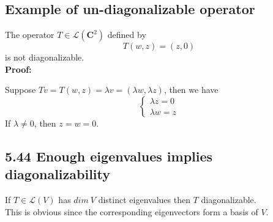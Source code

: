 \documentclass{article}
\begin{document}
\subsection*{Example of un-diagonalizable operator}
The operator $T \in \mathcal{L}(\mathbf{C}^2)$ defined by
\begin{equation*}
    T(w, z) = (z, 0)
\end{equation*}
is not diagonalizable.\\
\textbf{Proof:}
\begin{addmargin}[1em]{0em}
    Suppose $Tv = T(w, z) = \lambda v = (\lambda w, \lambda z)$, then we have
    \begin{equation*}
        \begin{cases}
            \lambda z = 0\\
            \lambda w = z
        \end{cases}
    \end{equation*}
    If $\lambda \neq 0$, then $z = w = 0$.
\end{addmargin}
\subsection*{5.44 Enough eigenvalues implies diagonalizability}
If $T \in \mathcal{L}(V)$ has $dim\ V$ distinct eigenvalues then $T$ diagonalizable.\\
This is obvious since the corresponding eigenvectors form a basis of $V$.
\end{document}
